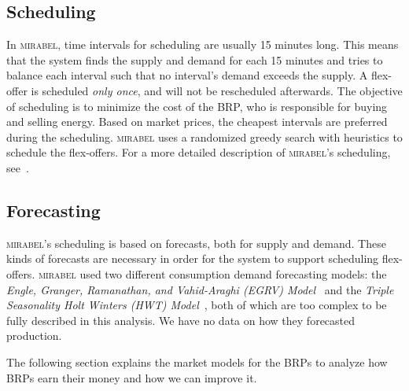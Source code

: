 \subsection{Scheduling}
In \textsc{mirabel}, time intervals for scheduling are usually 15 minutes long. This means that the system finds the supply and demand for each 15 minutes and tries to balance each interval such that no interval's demand exceeds the supply. A flex-offer is scheduled \emph{only once}, and will not be rescheduled afterwards. The objective of scheduling is to minimize the cost of the BRP, who is responsible for buying and selling energy. Based on market prices, the cheapest intervals are preferred during the scheduling. \textsc{mirabel} uses a randomized greedy search with heuristics to schedule the flex-offers. For a more detailed description of \textsc{mirabel}'s scheduling, see~\cite{IS2011}. 

\subsection{Forecasting}
\textsc{mirabel}'s scheduling is based on forecasts, both for supply and demand. These kinds of forecasts are necessary in order for the system to support scheduling flex-offers. \textsc{mirabel} used two different consumption demand forecasting models: the \emph{Engle, Granger, Ramanathan, and Vahid-Araghi (EGRV) Model}~\cite{EGRV} and the \emph{Triple Seasonality Holt Winters (HWT) Model}~\cite{HWT}, both of which are too complex to be fully described in this analysis. We have no data on how they forecasted production. 

The following section explains the market models for the BRPs to analyze how BRPs earn their money and how we can improve it. 
